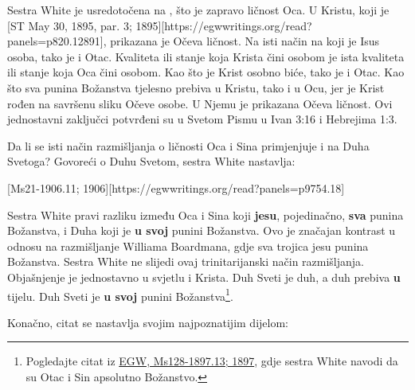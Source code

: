 Sestra White je usredotočena na , što je zapravo ličnost Oca. U Kristu, koji je [ST May 30, 1895, par. 3; 1895][https://egwwritings.org/read?panels=p820.12891], prikazana je Očeva ličnost. Na isti način na koji je Isus osoba, tako je i Otac. Kvaliteta ili stanje koja Krista čini osobom je ista kvaliteta ili stanje koja Oca čini osobom. Kao što je Krist osobno biće, tako je i Otac. Kao što sva punina Božanstva tjelesno prebiva u Kristu, tako i u Ocu, jer je Krist rođen na savršenu sliku Očeve osobe. U Njemu je prikazana Očeva ličnost. Ovi jednostavni zaključci potvrđeni su u Svetom Pismu u Ivan 3:16 i Hebrejima 1:3.

Da li se isti način razmišljanja o ličnosti Oca i Sina primjenjuje i na Duha Svetoga? Govoreći o Duhu Svetom, sestra White nastavlja:

[Ms21-1906.11; 1906][https://egwwritings.org/read?panels=p9754.18]

Sestra White pravi razliku između Oca i Sina koji \textbf{jesu}, pojedinačno, \textbf{sva} punina Božanstva, i Duha koji je \textbf{u svoj} punini Božanstva. Ovo je značajan kontrast u odnosu na razmišljanje Williama Boardmana, gdje sva trojica jesu punina Božanstva. Sestra White ne slijedi ovaj trinitarijanski način razmišljanja. Objašnjenje je jednostavno u svjetlu  i Krista. Duh Sveti je duh, a duh prebiva \textbf{u} tijelu. Duh Sveti je \textbf{u svoj} punini Božanstva\footnote{Pogledajte citat iz \href{https://egwwritings.org/?ref=en_Ms128-1897.13&para=5426.19}{{EGW, Ms128-1897.13; 1897}}, gdje sestra White navodi da su Otac i Sin apsolutno Božanstvo.}.

Konačno, citat se nastavlja svojim najpoznatijim dijelom:

